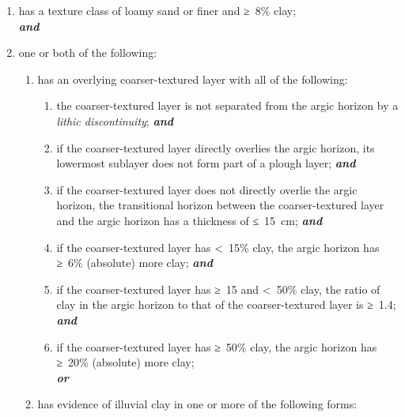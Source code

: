 \documentclass[
  letterpaper,
  DIV=11,
  numbers=noendperiod]{scrreprt}
\providecommand{\tightlist}{%
  \setlength{\itemsep}{0pt}\setlength{\parskip}{0pt}}\usepackage{longtable,booktabs,array}
\begin{document}
\begin{enumerate}
\def\labelenumi{\arabic{enumi}.}
\tightlist
\item
  has a texture class of loamy sand or finer and ≥~8\% clay;\\
  \textbf{\emph{and}}
\item
  one or both of the following:

  \begin{enumerate}
  \def\labelenumii{\alph{enumii}.}
  \tightlist
  \item
    has an overlying coarser-textured layer with all of the following:

    \begin{enumerate}
    \def\labelenumiii{\roman{enumiii}.}
    \tightlist
    \item
      the coarser-textured layer is not separated from the argic horizon
      by a \emph{lithic discontinuity}; \textbf{\emph{and}}
    \item
      if the coarser-textured layer directly overlies the argic horizon,
      its lowermost sublayer does not form part of a plough layer;
      \textbf{\emph{and}}
    \item
      if the coarser-textured layer does not directly overlie the argic
      horizon, the transitional horizon between the coarser-textured
      layer and the argic horizon has a thickness of ≤~15~cm;
      \textbf{\emph{and}}
    \item
      if the coarser-textured layer has \textless~15\% clay, the argic
      horizon has ≥~6\% (absolute) more clay; \textbf{\emph{and}}
    \item
      if the coarser-textured layer has ≥~15 and \textless~50\% clay,
      the ratio of clay in the argic horizon to that of the
      coarser-textured layer is ≥~1.4; \textbf{\emph{and}}
    \item
      if the coarser-textured layer has ≥~50\% clay, the argic horizon
      has ≥~20\% (absolute) more clay;\\
      \textbf{\emph{or}}
    \end{enumerate}
  \item
    has evidence of illuvial clay in one or more of the following forms:


\end{enumerate}
\end{enumerate}
\end{document}
